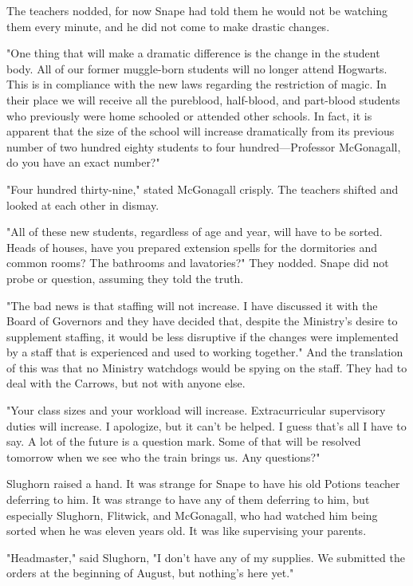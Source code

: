 The teachers nodded, for now Snape had told them he would not be watching them every minute, and he did not come to make drastic changes.

"One thing that will make a dramatic difference is the change in the student body. All of our former muggle-born students will no longer attend Hogwarts. This is in compliance with the new laws regarding the restriction of magic. In their place we will receive all the pureblood, half-blood, and part-blood students who previously were home schooled or attended other schools. In fact, it is apparent that the size of the school will increase dramatically from its previous number of two hundred eighty students to four hundred—Professor McGonagall, do you have an exact number?"

"Four hundred thirty-nine," stated McGonagall crisply. The teachers shifted and looked at each other in dismay.

"All of these new students, regardless of age and year, will have to be sorted. Heads of houses, have you prepared extension spells for the dormitories and common rooms? The bathrooms and lavatories?" They nodded. Snape did not probe or question, assuming they told the truth.

"The bad news is that staffing will not increase. I have discussed it with the Board of Governors and they have decided that, despite the Ministry's desire to supplement staffing, it would be less disruptive if the changes were implemented by a staff that is experienced and used to working together." And the translation of this was that no Ministry watchdogs would be spying on the staff. They had to deal with the Carrows, but not with anyone else.

"Your class sizes and your workload will increase. Extracurricular supervisory duties will increase. I apologize, but it can't be helped. I guess that's all I have to say. A lot of the future is a question mark. Some of that will be resolved tomorrow when we see who the train brings us. Any questions?"

Slughorn raised a hand. It was strange for Snape to have his old Potions teacher deferring to him. It was strange to have any of them deferring to him, but especially Slughorn, Flitwick, and McGonagall, who had watched him being sorted when he was eleven years old. It was like supervising your parents.

"Headmaster," said Slughorn, "I don't have any of my supplies. We submitted the orders at the beginning of August, but nothing's here yet."

